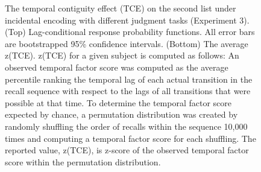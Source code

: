 \documentclass[man,natbib,floatsintext]{apa6} %
\begin{document}
\begin{figure}%
\caption{The temporal contiguity effect (TCE) on the second list under incidental encoding with different judgment tasks (Experiment 3). (Top) Lag-conditional response probability functions. All error bars are bootstrapped 95\% confidence intervals. (Bottom) The average z(TCE). z(TCE) for a given subject is computed as follows: An observed temporal factor score was computed as the average percentile ranking the temporal lag of each actual transition in the recall sequence with respect to the lags of all transitions that were possible at that time. To determine the temporal factor score expected by chance, a permutation distribution was created by randomly shuffling the order of recalls within the sequence 10,000 times and computing a temporal factor score for each shuffling. The reported value, z(TCE), is z-score of the observed temporal factor score within the permutation distribution.}
\label{e3_l2_crp}
\end{figure}


\end{document}
